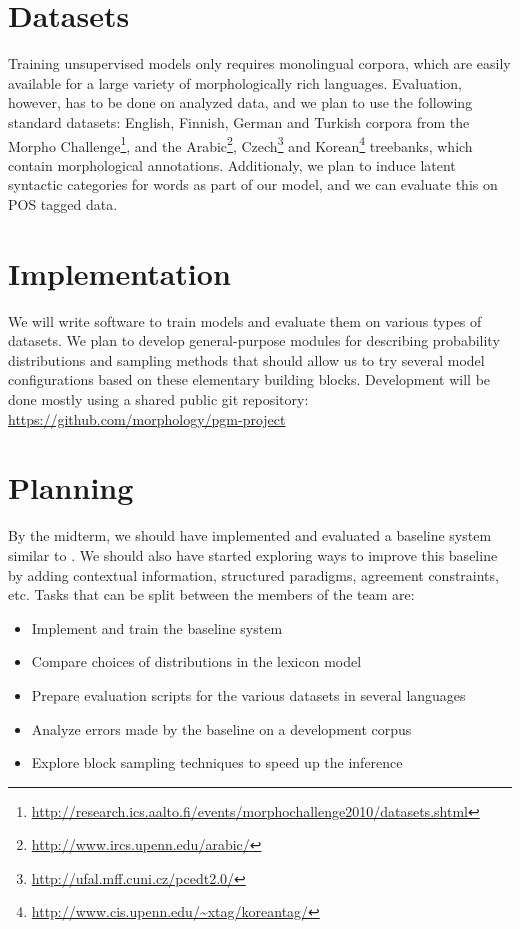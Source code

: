 \documentclass{article}
\begin{document}
\section{Datasets}
Training unsupervised models only requires monolingual corpora, which
are easily available for a large variety of morphologically rich
languages. Evaluation, however, has to be done on analyzed data, and
we plan to use the following standard datasets: English, Finnish,
German and Turkish corpora from the Morpho
Challenge\footnote{\url{http://research.ics.aalto.fi/events/morphochallenge2010/datasets.shtml}},
and the Arabic\footnote{\url{http://www.ircs.upenn.edu/arabic/}},
Czech\footnote{\url{http://ufal.mff.cuni.cz/pcedt2.0/}} and
Korean\footnote{\url{http://www.cis.upenn.edu/~xtag/koreantag/}}
treebanks, which contain morphological annotations. Additionaly, we
plan to induce latent syntactic categories for words as part of our
model, and we can evaluate this on POS tagged data.

\section{Implementation}
We will write software to train models and evaluate them on various
types of datasets. We plan to develop general-purpose modules for
describing probability distributions and sampling methods that should
allow us to try several model configurations based on these elementary
building blocks. Development will be done mostly using a shared public
git repository: \url{https://github.com/morphology/pgm-project}

\section{Planning}
By the midterm, we should have implemented and evaluated a baseline
system similar to \cite{goldwater2011}. We should also have started
exploring ways to improve this baseline by adding contextual
information, structured paradigms, agreement constraints, etc.  Tasks
that can be split between the members of the team are:
\begin{itemize}
  \item Implement and train the baseline system
  \item Compare choices of distributions in the lexicon model
  \item Prepare evaluation scripts for the various datasets in several languages
  \item Analyze errors made by the baseline on a development corpus
  \item Explore block sampling techniques to speed up the inference
\end{itemize}



\end{document}
